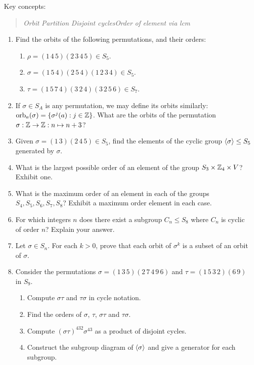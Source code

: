 \begin{exercises}
Key concepts:
\begin{quote}
	\emph{Orbit \qquad Partition \qquad Disjoint cycles\qquad Order of element via lcm}
\end{quote}

\begin{enumerate}
  \item Find the orbits of the following permutations, and their orders:
  \begin{enumerate}
    \item $\rho=(1\,4\,5)(2\,3\,4\,5)\in S_5$.
    \item $\sigma=(1\,5\,4)(2\,5\,4)(1\,2\,3\,4)\in S_5$.
    \item $\tau=(1\,5\,7\,4)(3\,2\,4)(3\,2\,5\,6)\in S_7$.
  \end{enumerate}


  \item If $\sigma\in S_A$ is any permutation, we may define its orbits similarly: $\mathrm{orb}_a(\sigma)=\{\sigma^j(a):j\in\mathbb{Z}\}$. What are the orbits of the permutation $\sigma:\mathbb{Z}\to\mathbb{Z}:n\mapsto n+3$?
  
	
	\item Given $\sigma=(1\,3)(2\,4\,5)\in S_5$, find the elements of the cyclic group $\left\langle \sigma\right\rangle\le S_5$ generated by $\sigma$.
	
	
	\item What is the largest possible order of an element of the group $S_3\times\mathbb{Z}_4\times V$? Exhibit one.


	\item What is the maximum order of an element in each of the groups $S_4,S_5,S_6,S_7,S_8$? Exhibit a maximum order element in each case.
	

	\item For which integers $n$ does there exist a subgroup $C_n\le S_8$ where $C_n$ is cyclic of order $n$? Explain your answer.
	

 	\item Let $\sigma\in S_n$. For each $k>0$, prove that each orbit of $\sigma^k$ is a subset of an orbit of $\sigma$.
 	

	\item Consider the permutations $\sigma=(1\,3\,5)(2\,7\,4\,9\,6)$ and $\tau=(1\,5\,3\,2)(6\,9)$ in $S_9$.
  \begin{enumerate}
      \item Compute $\sigma\tau$ and $\tau\sigma$ in cycle notation.
      \item Find the orders of $\sigma$, $\tau$, $\sigma\tau$ and $\tau\sigma$.
      \item Compute $(\sigma\tau)^{432}\sigma^{43}$ as a product of disjoint cycles.
			\item Construct the subgroup diagram of $\left\langle \sigma\right\rangle$ and give a generator for each subgroup.
  \end{enumerate}
  
\end{enumerate}

\end{exercises}

